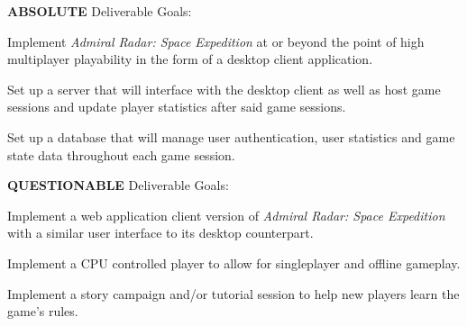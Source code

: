 \textbf{ABSOLUTE} Deliverable Goals:

  \item Implement \textit{Admiral Radar: Space Expedition} at or beyond the point of high multiplayer playability in the form of a desktop client application.
  \item Set up a server that will interface with the desktop client as well as host game sessions and update player statistics after said game sessions.
  \item Set up a database that will manage user authentication, user statistics and game state data throughout each game session.
  
\textbf{QUESTIONABLE} Deliverable Goals:

  \item Implement a web application client version of \textit{Admiral Radar: Space Expedition} with a similar user interface to its desktop counterpart.
  \item Implement a CPU controlled player to allow for singleplayer and offline gameplay.
  \item Implement a story campaign and/or tutorial session to help new players learn the game’s rules.
